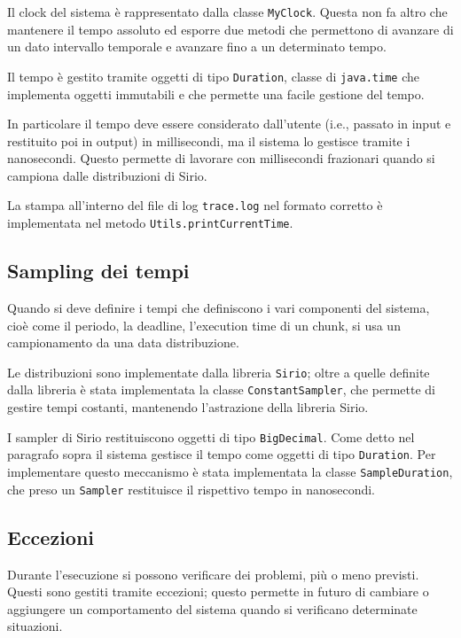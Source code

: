Il clock del sistema è rappresentato dalla classe \texttt{MyClock}. Questa non fa altro che mantenere il tempo assoluto ed esporre due metodi che permettono di avanzare di un dato intervallo temporale e avanzare fino a un determinato tempo.

\myskip

Il tempo è gestito tramite oggetti di tipo \texttt{Duration}, classe di \texttt{java.time} che implementa oggetti immutabili e che permette una facile gestione del tempo.

In particolare il tempo deve essere considerato dall'utente (i.e., passato in input e restituito poi in output) in millisecondi, ma il sistema lo gestisce tramite i nanosecondi. Questo permette di lavorare con millisecondi frazionari quando si campiona dalle distribuzioni di Sirio.

La stampa all'interno del file di log \texttt{trace.log} nel formato corretto è implementata nel metodo \texttt{Utils.printCurrentTime}.

\subsection{Sampling dei tempi}
Quando si deve definire i tempi che definiscono i vari componenti del sistema, cioè come il periodo, la deadline, l'execution time di un chunk, si usa un campionamento da una data distribuzione.

Le distribuzioni sono implementate dalla libreria \texttt{Sirio}; oltre a quelle definite dalla libreria è stata implementata la classe \texttt{ConstantSampler}, che permette di gestire tempi costanti, mantenendo l'astrazione della libreria Sirio.

\myskip

I sampler di Sirio restituiscono oggetti di tipo \texttt{BigDecimal}. Come detto nel paragrafo sopra il sistema gestisce il tempo come oggetti di tipo \texttt{Duration}. Per implementare questo meccanismo è stata implementata la classe \texttt{SampleDuration}, che preso un \texttt{Sampler} restituisce il rispettivo tempo in nanosecondi.

\subsection{Eccezioni}
Durante l'esecuzione si possono verificare dei problemi, più o meno previsti. Questi sono gestiti tramite eccezioni; questo permette in futuro di cambiare o aggiungere un comportamento del sistema quando si verificano determinate situazioni.

